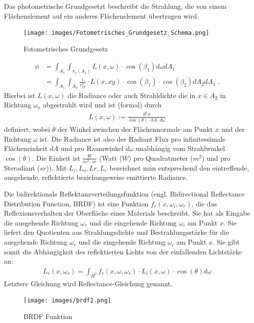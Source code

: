 \begin{Satz}

Das  photometrische Grundgesetzt beschreibt die Strahlung, die von einem  Flächenelement auf ein anderes  Flächenelement 
übertragen wird.  
 \begin{figure}[H]
    \centering
    \texttt{[image: images/Fotometrisches\_Grundgesetz\_Schema.png]}
    \caption{Fotometrisches Grundgesetz}
    \label{fig:cray}
\end{figure}

\begin{align}
\phi &= \int_{A_1} \int_{\pi_s(A_2)} L(x, \omega)\cdot \cos(\beta_1) d\omega  dA_1  \\
&= \int_{A_1} \int_{A_2} \frac{1}{r_{12}^2}  \cdot L(x, \overline{xy}) \cdot \cos(\beta_1) \cdot \cos(\beta_2)  d A_2 dA_1 \; .
\end{align}
Hierbei ist $L(x, \omega)$   die Radiance oder auch Strahldichte die in $x \in A_2$ in Richtung $\omega_x$ abgestrahlt wird und ist (formal) durch  
\begin{align}
L(x, \omega) := \frac{d^2 \phi}{\cos(\theta) \cdot dA \cdot d\omega} 
\end{align}
definiert, wobei $\theta$ der Winkel zwischen der Flächennormale am Punkt $x$ und der Richtung $\omega$ ist.
Die Radiance ist also der Radiant Flux pro infinitessimale Flächeneinheit $dA$ und pro  Raumwinkel $d \omega$ unabhängig vom Strahlwinkel $\cos(\theta)$.
Die Einheit ist $\frac{W}{m^2\cdot sr}$ (Watt ($W$) pro Quadratmeter ($m^2$) und pro Steradiant ($sr$)). 
Mit $L_i, L_o,Lr,L_e$ bezeichnet man entsprechend den eintreffende, ausgehende, reflektierte beziehungsweise emittierte Radiance.
\end{Satz}

\begin{Definition}
Die  bidirektionale Reflektanzverteilungsfunktion (engl. Bidirectional Reflectance Distribution Function, BRDF)
ist eine Funktion $f_r (x, \omega_i, \omega_r)$, die das Reflexionsverhalten der Oberfläche eines Materials beschreibt. 
Sie hat als Eingabe die ausgehende Richtung $\omega_r$ und die eingehende Richtung  $\omega_i$ am Punkt $x$. 
Sie  liefert den Quotienten aus Strahlungsdichte und Bestrahlungsstärke für die ausgehende Richtung $\omega_r$ und die eingehende Richtung  $\omega_i$ am Punkt $x$.
Sie gibt somit die Abhängigkeit des reflektierten Lichts von der einfallenden Lichtstärke an: 
\begin{align}
L_r(x, \omega_r) = \int_{H^2}f_r (x, \omega, \omega_r) \cdot L_i(x, \omega) \cdot  \cos(\theta) d\omega
\end{align}
Letztere Gleichung wird  Reflectance-Gleichung genannt.
\end{Definition}
 \begin{figure}[H]
    \centering
    \texttt{[image: images/brdf2.png]}
    \caption{BRDF Funktion}
    \label{fig:raytracin_brdf}
\end{figure}


